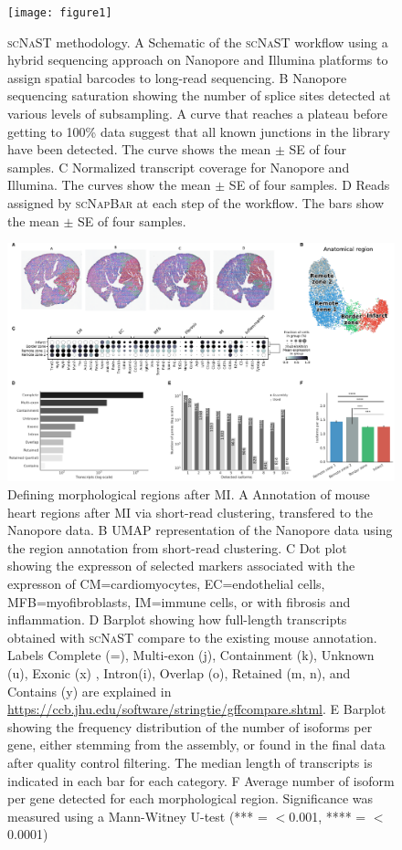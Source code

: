 \documentclass[utf8]{FrontiersinHarvard} %
\newcommand{\scn}{\textsc{scNapBar}\xspace}
\newcommand{\scnast}{\textsc{scNaST}\xspace}
\begin{document}
\begin{figure}[h!]
\begin{center}
\texttt{[image: figure1]}
\end{center}
\caption{\scnast methodology. A Schematic of the \scnast workflow using a hybrid sequencing approach on Nanopore and Illumina platforms to assign spatial barcodes to long-read sequencing. B Nanopore sequencing saturation showing the number of splice sites detected at various levels of subsampling. A curve that reaches a plateau before getting to 100\% data suggest that all known junctions in the library have been detected. The curve shows the mean $\pm$ SE of four samples. C Normalized transcript coverage for Nanopore and Illumina. The curves show the mean $\pm$ SE of four samples. D Reads assigned by \scn at each step of the workflow. The bars show the mean $\pm$ SE of four samples.}\label{fig:1}
\end{figure}


\begin{figure}[h!]
\begin{center}
\includegraphics[width=\textwidth]{figure2}
\end{center}
\caption{Defining morphological regions after MI. A Annotation of mouse heart regions after MI via short-read clustering, transfered to the Nanopore data. B UMAP representation of the Nanopore data using the region annotation from short-read clustering. C Dot plot showing the expresson of selected markers associated with the expresson of CM=cardiomyocytes, EC=endothelial cells, MFB=myofibroblasts, IM=immune cells, or with fibrosis and inflammation. D Barplot showing how full-length transcripts obtained with \scnast compare to the existing mouse annotation. Labels Complete (=), Multi-exon (j), Containment (k), Unknown (u), Exonic (x) , Intron(i), Overlap (o), Retained (m, n), and Contains (y) are explained in \url{https://ccb.jhu.edu/software/stringtie/gffcompare.shtml}. E Barplot showing the frequency distribution of the number of isoforms per gene, either stemming from the assembly, or found in the final data after quality control filtering. The median length of transcripts is indicated in each bar for each category. F Average number of isoform per gene detected for each morphological region. Significance was measured using a Mann-Witney U-test (*** = $<$0.001, **** = $<$0.0001)}\label{fig:2}
\end{figure}
\end{document}
